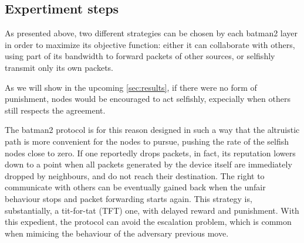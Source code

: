\documentclass[conference,10.5pt]{IEEEtran}
\begin{document}
\begin{table}[h]
\vspace{0.1cm}
\caption{Relevant parameters for building the network}
\label{tab:params}
\end{table}

\subsection{Expertiment steps}

As presented above, two different strategies can be chosen by each \gls{batman2} layer in order to maximize its objective function: either it can collaborate with others, using part of its bandwidth to forward packets of other sources, or selfishly transmit only its own packets.

As we will show in the upcoming \autoref{sec:results}, if there were no form of punishment, nodes would be encouraged to act selfishly, expecially when others still respects the agreement.

The \gls{batman2} protocol is for this reason designed in such a way that the altruistic path is more convenient for the nodes to pursue, pushing the rate of the selfish nodes close to zero.
If one reportedly drops packets, in fact, its reputation lowers down to a point when all packets generated by the device itself are immediately dropped by neighbours, and do not reach their destination. The right to communicate with others can be eventually gained back when the unfair behaviour stops and packet forwarding starts again.
This strategy is, substantially, a tit-for-tat (TFT) one, with delayed reward and punishment.
With this expedient, the protocol can avoid the escalation problem, which is common when mimicing the behaviour of the adversary previous move.
\end{document}
